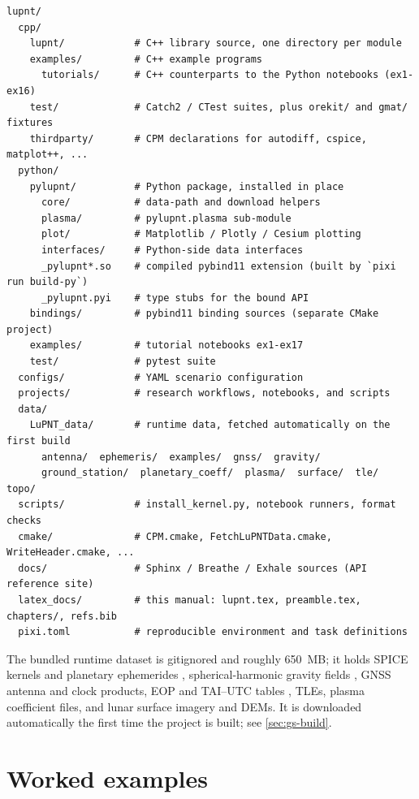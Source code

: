 \begin{lstlisting}[language=shell, caption={Top-level layout of the repository.}, label={lst:intro-layout}]
lupnt/
  cpp/
    lupnt/            # C++ library source, one directory per module
    examples/         # C++ example programs
      tutorials/      # C++ counterparts to the Python notebooks (ex1-ex16)
    test/             # Catch2 / CTest suites, plus orekit/ and gmat/ fixtures
    thirdparty/       # CPM declarations for autodiff, cspice, matplot++, ...
  python/
    pylupnt/          # Python package, installed in place
      core/           # data-path and download helpers
      plasma/         # pylupnt.plasma sub-module
      plot/           # Matplotlib / Plotly / Cesium plotting
      interfaces/     # Python-side data interfaces
      _pylupnt*.so    # compiled pybind11 extension (built by `pixi run build-py`)
      _pylupnt.pyi    # type stubs for the bound API
    bindings/         # pybind11 binding sources (separate CMake project)
    examples/         # tutorial notebooks ex1-ex17
    test/             # pytest suite
  configs/            # YAML scenario configuration
  projects/           # research workflows, notebooks, and scripts
  data/
    LuPNT_data/       # runtime data, fetched automatically on the first build
      antenna/  ephemeris/  examples/  gnss/  gravity/
      ground_station/  planetary_coeff/  plasma/  surface/  tle/  topo/
  scripts/            # install_kernel.py, notebook runners, format checks
  cmake/              # CPM.cmake, FetchLuPNTData.cmake, WriteHeader.cmake, ...
  docs/               # Sphinx / Breathe / Exhale sources (API reference site)
  latex_docs/         # this manual: lupnt.tex, preamble.tex, chapters/, refs.bib
  pixi.toml           # reproducible environment and task definitions
\end{lstlisting}

The bundled runtime dataset  is gitignored and roughly
650~MB; it holds SPICE kernels and planetary ephemerides
\citep{park2021de440}, spherical-harmonic gravity fields
\citep{lemoine2013grgm}, GNSS antenna and clock products, EOP and TAI--UTC
tables \citep{iers2010}, TLEs, plasma coefficient files, and lunar surface
imagery and DEMs. It is downloaded automatically the first time the project is
built; see \cref{sec:gs-build}.

\section{Worked examples}
\label{sec:intro-examples}

